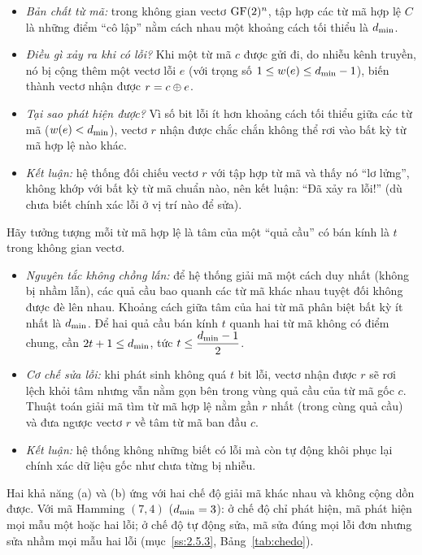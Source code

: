 \begin{itemize}
  \item \emph{Bản chất từ mã:} trong không gian vectơ $\mathrm{GF}(2)^{n}$, tập hợp các
        từ mã hợp lệ $C$ là những điểm ``cô lập'' nằm cách nhau một khoảng
        cách tối thiểu là $d_{\min}$.
  \item \emph{Điều gì xảy ra khi có lỗi?} Khi một từ mã $c$ được gửi đi, do
        nhiễu kênh truyền, nó bị cộng thêm một vectơ lỗi $e$ (với trọng số
        $1 \le w(e) \le d_{\min} - 1$), biến thành vectơ nhận được
        $r = c \oplus e$.
  \item \emph{Tại sao phát hiện được?} Vì số bit lỗi ít hơn khoảng cách tối
        thiểu giữa các từ mã ($w(e) < d_{\min}$), vectơ $r$ nhận được chắc chắn
        không thể rơi vào bất kỳ từ mã hợp lệ nào khác.
  \item \emph{Kết luận:} hệ thống đối chiếu vectơ $r$ với tập hợp từ mã và thấy
        nó ``lơ lửng'', không khớp với bất kỳ từ mã chuẩn nào, nên kết luận:
        ``Đã xảy ra lỗi!'' (dù chưa biết chính xác lỗi ở vị trí nào để sửa).
\end{itemize}

Hãy tưởng tượng mỗi từ mã
hợp lệ là tâm của một ``quả cầu'' có bán kính là $t$ trong không gian vectơ.
\begin{itemize}
  \item \emph{Nguyên tắc không chồng lấn:} để hệ thống giải mã một cách duy
        nhất (không bị nhầm lẫn), các quả cầu bao quanh các từ mã khác nhau
        tuyệt đối không được đè lên nhau. Khoảng cách giữa tâm của hai từ mã
        phân biệt bất kỳ ít nhất là $d_{\min}$. Để hai quả cầu bán kính $t$ quanh
        hai từ mã không có điểm chung, cần
        $2t + 1 \le d_{\min}$, tức $t \le \dfrac{d_{\min} - 1}{2}$.
  \item \emph{Cơ chế sửa lỗi:} khi phát sinh không quá $t$ bit lỗi, vectơ nhận
        được $r$ sẽ rơi lệch khỏi tâm nhưng vẫn nằm gọn bên trong vùng quả cầu
        của từ mã gốc $c$. Thuật toán giải mã tìm từ mã hợp lệ nằm gần $r$
        nhất (trong cùng quả cầu) và đưa ngược vectơ $r$ về tâm từ mã ban đầu
        $c$.
  \item \emph{Kết luận:} hệ thống không những biết có lỗi mà còn tự động khôi
        phục lại chính xác dữ liệu gốc như chưa từng bị nhiễu.
\end{itemize}

\begin{luuy}
Hai khả năng (a) và (b) ứng với hai chế độ giải mã khác nhau và không cộng dồn
được. Với mã Hamming $(7,4)$ ($d_{\min} = 3$): ở chế độ chỉ phát hiện, mã phát
hiện mọi mẫu một hoặc hai lỗi; ở chế độ tự động sửa, mã sửa đúng mọi lỗi đơn
nhưng sửa nhầm mọi mẫu hai lỗi (mục~\ref{ss:2.5.3}, Bảng~\ref{tab:chedo}).
\end{luuy}

